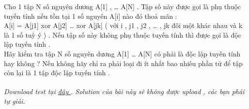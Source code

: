 Cho 1 tập N số nguyên dương A[1] , … A[N] . Tập số này được gọi là phụ thuộc tuyến tính nếu tồn tại 1 số nguyên A[i] nào đó thoả mãn :   
\\   A[i] = A[j1] xor A[j2] … xor A[jk] ( với i , j1 , j2 , … , jk  đôi một khác nhau và k là 1 số tuỳ ý ) . Nếu tập số này không phụ thuộc tuyến tính thì được gọi là độc lập tuyến tính .   
\\   Hãy kiểm tra tập N số nguyên dương A[1] … A[N] có phải là độc lập tuyến tính hay không ? Nếu không hãy chỉ ra phải loại đi ít nhất bao nhiêu phần tử để tập còn lại là 1 tập độc lập tuyến tính .   
\\
\\\textit{    Download test tại    \href{http://vn.spoj.pl/content/XOR.rar}{     đây    }    . Solution của bài này sẽ không được upload , các bạn phải tự giải.   }

\